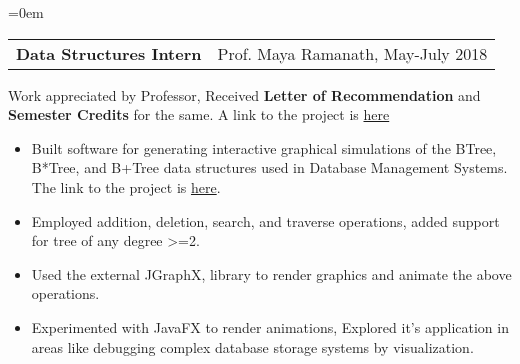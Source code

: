 \documentclass{article}
\makeatletter
\newcommand{\headerrow}[2]
{\begin{tabular*}{\linewidth}{l@{\extracolsep{\fill}}r}
	#1 &
	#2 \\
\end{tabular*}}
\makeatother
\begin{document}
\begin{list} {}{\leftmargin=0em}
    \item[]
    \headerrow {\textbf{Data Structures Intern}}{Prof. Maya Ramanath, May-July 2018}
    Work appreciated by Professor, Received \textbf{Letter of Recommendation} and \textbf{Semester Credits} for the same. A link to the project is \href{https://github.com/Yashpandey4/BTree_Vis}{here}
    \begin{itemize}
    \setlength\itemsep{0.0em}
        \item Built software for generating interactive graphical simulations of the BTree, B*Tree, and B+Tree data structures used in Database Management Systems. The link to the project is \href{https://github.com/Yashpandey4/BTree_Vis}{here}.
        \item Employed addition, deletion, search, and traverse operations, added support for tree of any degree \textgreater=2.
        \item Used the external JGraphX,  library to render graphics and animate the above operations.
        \item Experimented with JavaFX to render animations, Explored it's application in areas like debugging complex database storage systems by visualization.
    \end{itemize}

     

\end{list}
\end{document}
